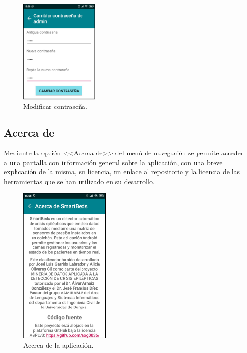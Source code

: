 \begin{figure}[H]
	\centering
	\includegraphics[width=0.35\textwidth]{../img/cambiarcontrasena.png}
	\caption{Modificar contraseña.}
	\label{fig:cambiarcontrasena}
\end{figure} 

\subsection{Acerca de}

Mediante la opción <<Acerca de>> del menú de navegación se permite acceder a una pantalla con información general sobre la aplicación, con una breve explicación de la misma, su licencia, un enlace al repositorio y la licencia de las herramientas que se han utilizado en su desarrollo. 

\begin{figure}[H]
	\centering
	\includegraphics[width=0.4\textwidth]{../img/acercade.png}
	\caption{Acerca de la aplicación.}
	\label{fig:acercade}
\end{figure}


